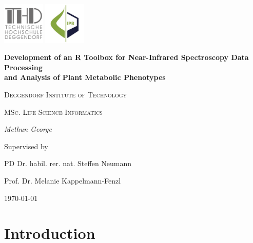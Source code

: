 \documentclass[12pt,a4paper]{report}
\begin{document}
\begin{titlepage}
    \centering
    \begin{flushright}
        \centering
        \includegraphics[width=2cm]{images/thd.png} %
        \hspace{0cm} %
        \includegraphics[width=2cm]{images/ipb.jpg} %
    \end{flushright}
    {\huge\bfseries Development of an R Toolbox for Near-Infrared Spectroscopy Data Processing \\
    and Analysis of Plant Metabolic Phenotypes\par}
    \vspace{2cm}
    {\LARGE \textsc{Deggendorf Institute of Technology}\par}
    \vspace{1cm}
    {\Large \textsc{MSc. Life Science Informatics}\par}
    \vspace{1.5cm}
    {\Large\itshape Methun George\par}
    \vfill
    Supervised by\par
    PD Dr. habil. rer. nat. Steffen Neumann\par
    Prof. Dr. Melanie Kappelmann-Fenzl
    \vfill
    {\large \today\par}
\end{titlepage}

\newpage
\tableofcontents
\newpage


\chapter{Introduction}
\end{document}

